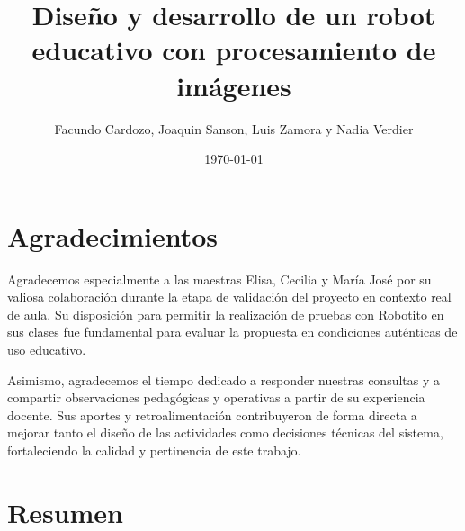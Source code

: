 \documentclass{prgrado}
\title{Diseño y desarrollo de un robot educativo con procesamiento de imágenes}
\author{Facundo Cardozo, Joaquin Sanson, Luis Zamora y Nadia Verdier}
\date{\today}
\begin{document}

\frontmatter %

\maketitle



\chapter*{Agradecimientos}

Agradecemos especialmente a las maestras Elisa, Cecilia y María José por su valiosa colaboración durante la etapa de validación del proyecto en contexto real de aula. Su disposición para permitir la realización de pruebas con Robotito en sus clases fue fundamental para evaluar la propuesta en condiciones auténticas de uso educativo.

Asimismo, agradecemos el tiempo dedicado a responder nuestras consultas y a compartir observaciones pedagógicas y operativas a partir de su experiencia docente. Sus aportes y retroalimentación contribuyeron de forma directa a mejorar tanto el diseño de las actividades como decisiones técnicas del sistema, fortaleciendo la calidad y pertinencia de este trabajo.




\chapter*{Resumen}

\end{document}
